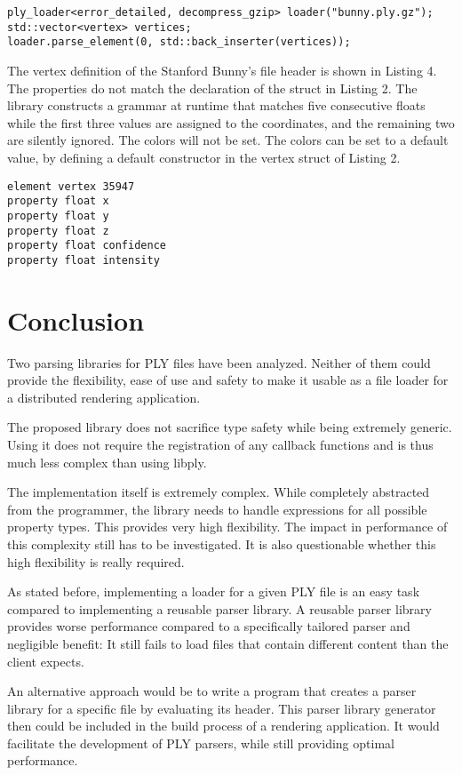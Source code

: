 \documentclass[a4paper,parskip=half,twocolumn]{scrartcl}
\begin{document}
\begin{lstlisting}[frame=tb,caption=Example use of the library]
ply_loader<error_detailed, decompress_gzip> loader("bunny.ply.gz");
std::vector<vertex> vertices;
loader.parse_element(0, std::back_inserter(vertices));
\end{lstlisting}

The vertex definition of the Stanford Bunny's file header is shown in Listing
4. The properties do not match the declaration of the struct in Listing 2. The
library constructs a grammar at runtime that matches five consecutive floats
while the first three values are assigned to the coordinates, and the remaining
two are silently ignored. The colors will not be set. The colors can be set to a
default value, by defining a default constructor in the vertex struct of Listing
2.

\begin{lstlisting}[frame=tb,
  caption=Stanford Bunny's definition of the vertex element]
element vertex 35947
property float x
property float y
property float z
property float confidence
property float intensity
\end{lstlisting}

\section{Conclusion}

Two parsing libraries for PLY files have been analyzed. Neither of them could
provide the flexibility, ease of use and safety to make it usable as a file
loader for a distributed rendering application.

The proposed library does not sacrifice type safety while being extremely
generic. Using it does not require the registration of any callback functions
and is thus much less complex  than using libply.

The implementation itself is extremely complex. While completely abstracted from
the programmer, the library needs to handle expressions for all possible
property types. This provides very high flexibility. The impact in performance
of this complexity still has to be investigated. It is also questionable whether
this high flexibility is really required.

As stated before, implementing a loader for a given PLY file is an easy task
compared to implementing a reusable parser library. A reusable parser library
provides worse performance compared to a specifically tailored parser and
negligible benefit: It still fails to load files that contain different content
than the client expects.

An alternative approach would be to write a program that creates a parser
library for a specific file by evaluating its header. This parser library
generator then could be included in the build process of a rendering
application. It would facilitate the development of PLY parsers, while still
providing optimal performance.

%
%
\end{document}
